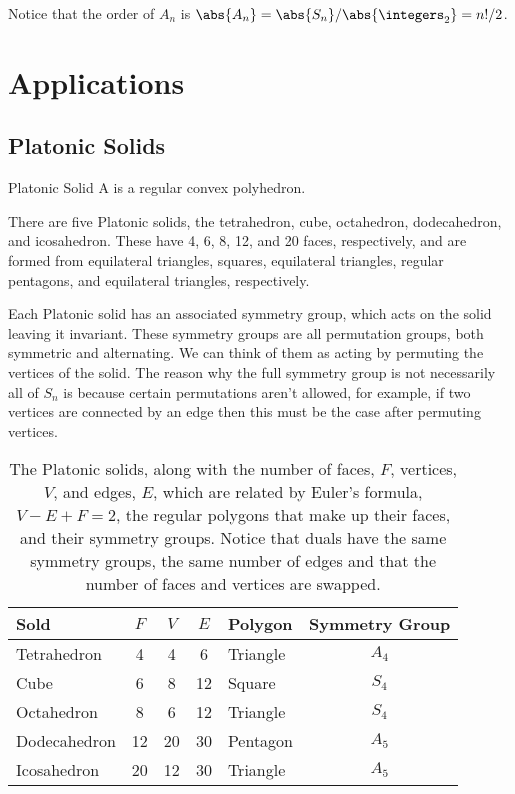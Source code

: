 Notice that the order of \(A_n\) is \(\abs{A_n} = \abs{S_n}/\abs{\integers_2} = n!/2\).

\chapter{Applications}
\section{Platonic Solids}
\begin{dfn}{Platonic Solid}{}
    A  is a regular convex polyhedron.
\end{dfn}

There are five Platonic solids, the tetrahedron, cube, octahedron, dodecahedron, and icosahedron.
These have 4, 6, 8, 12, and 20 faces, respectively, and are formed from equilateral triangles, squares, equilateral triangles, regular pentagons, and equilateral triangles, respectively.

Each Platonic solid has an associated symmetry group, which acts on the solid leaving it invariant.
These symmetry groups are all permutation groups, both symmetric and alternating.
We can think of them as acting by permuting the vertices of the solid.
The reason why the full symmetry group is not necessarily all of \(S_n\) is because certain permutations aren't allowed, for example, if two vertices are connected by an edge then this must be the case after permuting vertices.

\begin{table}
    \caption{The Platonic solids, along with the number of faces, \(F\), vertices, \(V\), and edges, \(E\), which are related by Euler's formula, \(V - E + F = 2\), the regular polygons that make up their faces, and their symmetry groups. Notice that duals have the same symmetry groups, the same number of edges and that the number of faces and vertices are swapped.}
    \begin{tabular}{lccclc}\toprule
        Sold & \(F\) & \(V\) & \(E\) & Polygon & Symmetry Group \\ \midrule
        Tetrahedron & 4 & 4 & 6 & Triangle & \(A_4\)\\
        Cube & 6 & 8 & 12 & Square & \(S_4\)\\
        Octahedron & 8 & 6 & 12 & Triangle & \(S_4\)\\
        Dodecahedron & 12 & 20 & 30 & Pentagon & \(A_5\)\\
        Icosahedron & 20 & 12 & 30 & Triangle & \(A_5\)\\\bottomrule
    \end{tabular}
\end{table}


